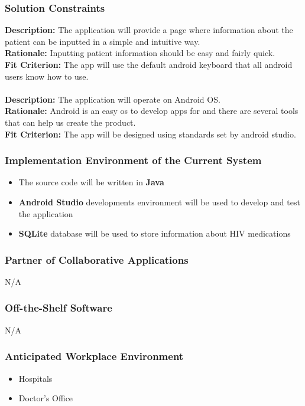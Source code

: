 \documentclass[12pt]{article}
\begin{document}
\subsubsection{Solution Constraints}
{\bf Description:} The application will provide a page where information about the patient can be inputted in a simple and intuitive way.\\
{\bf Rationale:} Inputting patient information should be easy and fairly quick.\\
{\bf Fit Criterion:} The app will use the default android keyboard that all android users know how to use.\\ \\
{\bf Description:} The application will operate on Android OS.\\
{\bf Rationale:} Android is an easy os to develop apps for and there are several tools that can help us create the product.\\
{\bf Fit Criterion:} The app will be designed using standards set by android studio.

\subsubsection{Implementation Environment of the Current System}
\begin{itemize}
\item The source code will be written in {\bf Java}
\item {\bf Android Studio} developments environment will be used to develop and test the application
\item {\bf SQLite} database will be used to store information about HIV medications
\end{itemize}
\subsubsection{Partner of Collaborative Applications}
N/A
\subsubsection{Off-the-Shelf Software}
N/A
\subsubsection{Anticipated Workplace Environment}
\begin{itemize}
\item Hospitals
\item Doctor's Office
\end{itemize}
\end{document}
